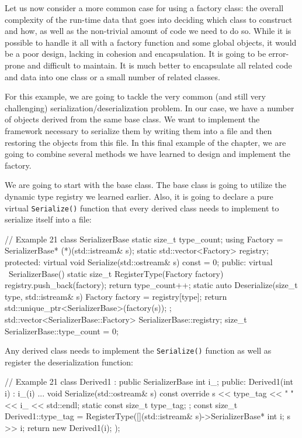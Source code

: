 Let us now consider a more common case for using a factory class: the overall complexity of the run-time data that goes into deciding which class to construct and how, as well as the non-trivial amount of code we need to do so. While it is possible to handle it all with a factory function and some global objects, it would be a poor design, lacking in cohesion and encapsulation. It is going to be error-prone and difficult to maintain. It is much better to encapsulate all related code and data into one class or a small number of related classes.

For this example, we are going to tackle the very common (and still very challenging) serialization/deserialization problem. In our case, we have a number of objects derived from the same base class. We want to implement the framework necessary to serialize them by writing them into a file and then restoring the objects from this file. In this final example of the chapter, we are going to combine several methods we have learned to design and implement the factory.

We are going to start with the base class. The base class is going to utilize the dynamic type registry we learned earlier. Also, it is going to declare a pure virtual \texttt{Serialize()} function that every derived class needs to implement to serialize itself into a file:

\begin{code}
// Example 21
class SerializerBase {
  static size_t type_count;
  using Factory = SerializerBase* (*)(std::istream& s);
  static std::vector<Factory> registry;
  protected:
  virtual void Serialize(std::ostream& s) const = 0;
  public:
  virtual ~SerializerBase() {}
  static size_t RegisterType(Factory factory) {
    registry.push_back(factory);
    return type_count++;
  }
  static auto Deserialize(size_t type, std::istream& s) {
    Factory factory = registry[type];
    return std::unique_ptr<SerializerBase>(factory(s));
  }
};
std::vector<SerializerBase::Factory>
  SerializerBase::registry;
size_t SerializerBase::type_count = 0;
\end{code}

Any derived class needs to implement the \texttt{Serialize()} function as well as register the deserialization function:

\begin{code}
// Example 21
class Derived1 : public SerializerBase {
  int i_;
  public:
  Derived1(int i) : i_(i) {...}
  void Serialize(std::ostream& s) const override {
    s << type_tag << " " << i_ << std::endl;
  }
  static const size_t type_tag;
};
const size_t Derived1::type_tag =
  RegisterType([](std::istream& s)->SerializerBase* {
    int i; s >> i; return new Derived1(i); });
\end{code}

